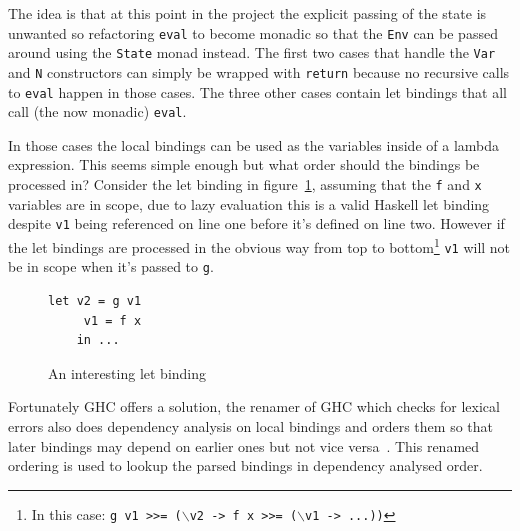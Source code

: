 The idea is that at this point in the project the explicit passing of the state is unwanted so refactoring \texttt{eval} to become monadic so that the \texttt{Env} can be passed around using the \texttt{State} monad instead. The first two cases that handle the \texttt{Var} and \texttt{N} constructors can simply be wrapped with \texttt{return} because no recursive calls to \texttt{eval} happen in those cases. The three other cases contain let bindings that all call (the now monadic) \texttt{eval}. 

In those cases the local bindings can be used as the variables inside of a lambda expression. This seems simple enough but what order should the bindings be processed in? Consider the let binding in figure~\ref{intLet}, assuming that the \texttt{f} and \texttt{x} variables are in scope, due to lazy evaluation this is a valid Haskell let binding despite \texttt{v1} being referenced on line one before it's defined on line two. However if the let bindings are processed in the obvious way from top to bottom\footnote{In this case: \texttt{g v1 >>= ($\backslash$v2 -> f x >>= ($\backslash$v1 -> ...))}} \texttt{v1} will not be in scope when it's passed to \texttt{g}.  

\begin{figure}[t]
\begin{lstlisting}
let v2 = g v1
     v1 = f x
    in ...
\end{lstlisting}
\caption{An interesting let binding}
\label{intLet}
\end{figure}

Fortunately GHC offers a solution, the renamer of GHC which checks for lexical errors also does dependency analysis on local bindings and orders them so that later bindings may depend on earlier ones but not vice versa~\citep{ghcApi}. This renamed ordering is used to lookup the parsed bindings in dependency analysed order.

